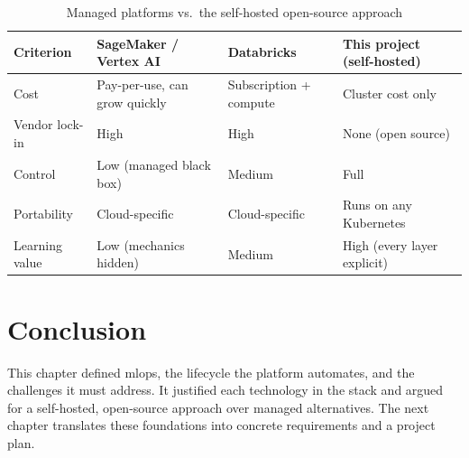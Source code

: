 \begin{table}[H]\centering
\caption{Managed platforms vs.\ the self-hosted open-source approach}
\label{tab:comparison}
\renewcommand{\arraystretch}{1.3}
\begin{tabularx}{\textwidth}{|>{\raggedright\arraybackslash}p{2.6cm}|X|X|X|}
\hline
\textbf{Criterion} & \textbf{SageMaker / Vertex AI} & \textbf{Databricks} & \textbf{This project (self-hosted)}\\
\hline
Cost            & Pay-per-use, can grow quickly & Subscription + compute & Cluster cost only\\
\hline
Vendor lock-in  & High & High & None (open source)\\
\hline
Control         & Low (managed black box) & Medium & Full\\
\hline
Portability     & Cloud-specific & Cloud-specific & Runs on any Kubernetes\\
\hline
Learning value  & Low (mechanics hidden) & Medium & High (every layer explicit)\\
\hline
\end{tabularx}
\end{table}

\section*{Conclusion}
This chapter defined \gls{mlops}, the lifecycle the platform automates, and the
challenges it must address. It justified each technology in the stack and argued
for a self-hosted, open-source approach over managed alternatives. The next
chapter translates these foundations into concrete requirements and a project
plan.
